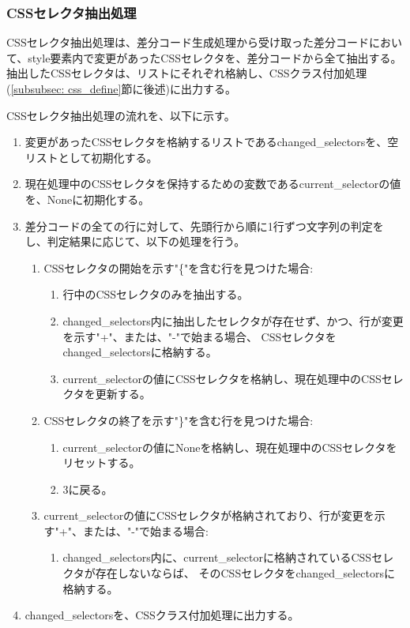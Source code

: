 \subsubsection{CSSセレクタ抽出処理}\label{subsubsec: style_analysis}
CSSセレクタ抽出処理は、差分コード生成処理から受け取った差分コードにおいて、style要素内で変更があったCSSセレクタ\cite{CssSelector}を、差分コードから全て抽出する。
抽出したCSSセレクタは、リストにそれぞれ格納し、CSSクラス付加処理(\ref{subsubsec: css_define}節に後述)に出力する。
\par
CSSセレクタ抽出処理の流れを、以下に示す。
\begin{enumerate}
    \item 変更があったCSSセレクタを格納するリストであるchanged\_selectorsを、空リストとして初期化する。
    \item 現在処理中のCSSセレクタを保持するための変数であるcurrent\_selectorの値を、Noneに初期化する。
    \item 差分コードの全ての行に対して、先頭行から順に1行ずつ文字列の判定をし、判定結果に応じて、以下の処理を行う。
          \begin{enumerate}
              \item CSSセレクタの開始を示す"\{"を含む行を見つけた場合:
                    \begin{enumerate}
                        \item 行中のCSSセレクタのみを抽出する。
                        \item changed\_selectors内に抽出したセレクタが存在せず、かつ、行が変更を示す"+"、または、"-"で始まる場合、
                              CSSセレクタをchanged\_selectorsに格納する。
                        \item current\_selectorの値にCSSセレクタを格納し、現在処理中のCSSセレクタを更新する。
                    \end{enumerate}
              \item CSSセレクタの終了を示す"\}"を含む行を見つけた場合:
                    \begin{enumerate}
                        \item current\_selectorの値にNoneを格納し、現在処理中のCSSセレクタをリセットする。
                        \item 3に戻る。
                    \end{enumerate}
              \item current\_selectorの値にCSSセレクタが格納されており、行が変更を示す"+"、または、"-"で始まる場合:
                    \begin{enumerate}
                        \item changed\_selectors内に、current\_selectorに格納されているCSSセレクタが存在しないならば、
                              そのCSSセレクタをchanged\_selectorsに格納する。
                    \end{enumerate}
          \end{enumerate}
    \item changed\_selectorsを、CSSクラス付加処理に出力する。
\end{enumerate}

